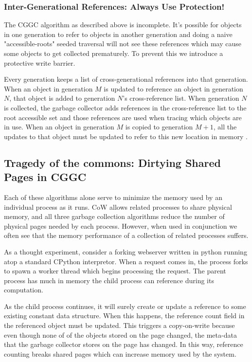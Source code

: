 \documentclass{article}
\begin{document}
\subsubsection{Inter-Generational References: Always Use Protection!}

The CGGC algorithm as described above is incomplete.  It's possible for objects in one generation to refer to objects in another generation and doing a naive "accessible-roots" seeded traversal will not see these references which may cause some objects to get collected prematurely.  To prevent this we introduce a protective write barrier.  

Every generation keeps a list of cross-generational references into that generation.  When an object in generation $M$ is updated to reference an object in generation $N$, that object is added to generation $N$'s cross-reference list.  When generation $N$ is collected, the garbage collector adds references in the cross-reference list to the root accessible set and those references are used when tracing which objects are in use.  When an object in generation $M$ is copied to generation $M + 1$, all the updates to that object must be updated to refer to this new location in memory \cite{GC-continuum}.  

\subsection{Tragedy of the commons: Dirtying Shared Pages in CGGC}\label{sec:CoWGC}

Each of these algorithms alone serve to minimize the memory used by an individual process as it runs.  CoW allows related processes to share physical memory, and all three garbage collection algorithms reduce the number of physical pages needed by each process.  However, when used in conjunction we often see that the memory performance of a collection of related processes suffers.

As a thought experiment, consider a forking webserver written in python running atop a standard CPython interpretor.  When a request comes in, the process forks to spawn a worker thread which begins processing the request.  The parent process has much in memory the child process can reference during its computation.  

As the child process continues, it will surely create or update a reference to some existing constant data structure.  When this happens, the reference count field in the referenced object must be updated.  This triggers a copy-on-write because even though none of of the objects stored on the page changed, the meta-data that the garbage collector stores on the page has changed.  In this way, reference counting breaks shared pages which can increase memory used by the system.
\end{document}
